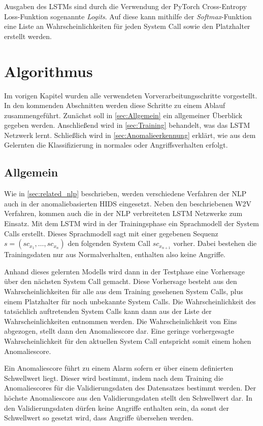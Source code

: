         Ausgaben des \acp{LSTM} sind durch die Verwendung der PyTorch Cross-Entropy Loss-Funktion sogenannte \textit{Logits}.
        Auf diese kann mithilfe der \textit{Softmax}-Funktion eine Liste an Wahrscheinlichkeiten für jeden System Call sowie den Platzhalter erstellt werden.
        \newpage

    \section{Algorithmus}\label{sec:Algorithmus}
        Im vorigen Kapitel wurden alle verwendeten Vorverarbeitungsschritte vorgestellt.
        In den kommenden Abschnitten werden diese Schritte zu einem Ablauf zusammengeführt.
        Zunächst soll in \autoref{sec:Allgemein} ein allgemeiner Überblick gegeben werden.
        Anschließend wird in \autoref{sec:Training} behandelt, was das \ac{LSTM} Netzwerk lernt.
        Schließlich wird in \autoref{sec:Anomalieerkennung} erklärt, wie aus dem Gelernten die Klassifizierung in normales oder Angriffsverhalten erfolgt.

        \subsection{Allgemein}\label{sec:Allgemein}
            Wie in \autoref{sec:related_nlp} beschrieben, werden verschiedene Verfahren der \ac{NLP} auch in der anomaliebasierten \ac{HIDS} eingesetzt.
            Neben den beschriebenen \ac{W2V} Verfahren, kommen auch die in der \ac{NLP} verbreiteten \ac{LSTM} Netzwerke zum Einsatz.
            Mit dem \ac{LSTM} wird in der Trainingsphase ein Sprachmodell der System Calls erstellt.
            Dieses Sprachmodell sagt mit einer gegebenen Sequenz $s = (sc_{x_1},\dots,sc_{x_n})$ den folgenden System Call $sc_{x_{n+1}}$ vorher. 
            Dabei bestehen die Trainingsdaten nur aus Normalverhalten, enthalten also keine Angriffe.\par\medskip

            Anhand dieses gelernten Modells wird dann in der Testphase eine Vorhersage über den nächsten System Call gemacht.
            Diese Vorhersage besteht aus den Wahrscheinlichkeiten für alle aus dem Training gesehenen System Calls, plus einem Platzhalter für noch unbekannte System Calls.
            Die Wahrscheinlichkeit des tatsächlich auftretenden System Calls kann dann aus der Liste der Wahrscheinlichkeiten entnommen werden.
            Die Wahrscheinlichkeit von Eins abgezogen, stellt dann den Anomaliescore dar.
            Eine geringe vorhergesagte Wahrscheinlichkeit für den aktuellen System Call entspricht somit einem hohen Anomaliescore.\par\medskip
            Ein Anomaliescore führt zu einem Alarm sofern er über einem definierten Schwellwert liegt.
            Dieser wird bestimmt, indem nach dem Training die Anomaliescores für die Validierungsdaten des Datensatzes bestimmt werden.
            Der höchste Anomaliescore aus den Validierungsdaten stellt den Schwellwert dar.
            In den Validierungsdaten dürfen keine Angriffe enthalten sein, da sonst der Schwellwert so gesetzt wird, dass Angriffe übersehen werden.\par\medskip

